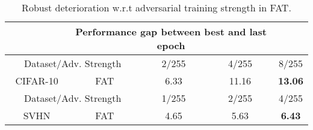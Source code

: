 \documentclass{article} %
\theoremstyle{plain}
\theoremstyle{definition}
\theoremstyle{remark}
\begin{document}
\vspace{2mm}
\begin{table}[ht]
\centering 
\caption{Robust deterioration w.r.t adversarial training strength in FAT.}
\footnotesize
\label{table:robust_deter_adv}
\begin{tabular}{c|c|c|c|c}
\toprule[1.5pt]
\rowcolor{greyC} \multicolumn{2}{c|}{Setting} & \multicolumn{3}{c}{Performance gap between best and last epoch} \\

\midrule[0.6pt]
\multicolumn{2}{c|}{Dataset/Adv. Strength} & 2/255 & 4/255 & 8/255  \\
\midrule[0.6pt]
\midrule[0.6pt]
CIFAR-10 & FAT & 6.33 & 11.16 & \textbf{13.06}  \\
\midrule[0.6pt]
\multicolumn{2}{c|}{Dataset/Adv. Strength} & 1/255 & 2/255 & 4/255  \\
\midrule[0.6pt]
SVHN & FAT & 4.65 & 5.63 & \textbf{6.43} \\
\bottomrule[1.5pt]
\end{tabular}
\end{table}
\vspace{3mm}
\end{document}
